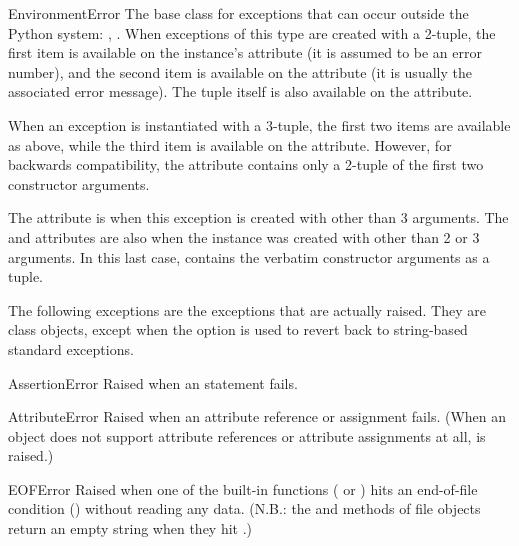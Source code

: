 \begin{excdesc}{EnvironmentError}
The base class for exceptions that
can occur outside the Python system: ,
.  When exceptions of this type are created with a
2-tuple, the first item is available on the instance's 
attribute (it is assumed to be an error number), and the second item
is available on the  attribute (it is usually the
associated error message).  The tuple itself is also available on the
 attribute.

When an  exception is instantiated with a
3-tuple, the first two items are available as above, while the third
item is available on the  attribute.  However, for
backwards compatibility, the  attribute contains only a
2-tuple of the first two constructor arguments.

The  attribute is  when this exception is
created with other than 3 arguments.  The  and
 attributes are also  when the instance was
created with other than 2 or 3 arguments.  In this last case,
 contains the verbatim constructor arguments as a tuple.
\end{excdesc}


The following exceptions are the exceptions that are actually raised.
They are class objects, except when the  option is used to
revert back to string-based standard exceptions.

\begin{excdesc}{AssertionError}
Raised when an  statement fails.
\end{excdesc}

\begin{excdesc}{AttributeError}
  Raised when an attribute reference or assignment fails.  (When an
  object does not support attribute references or attribute assignments
  at all,  is raised.)
\end{excdesc}

\begin{excdesc}{EOFError}
  Raised when one of the built-in functions ( or
  ) hits an end-of-file condition (\EOF{}) without
  reading any data.
  (N.B.: the  and  methods of file
  objects return an empty string when they hit \EOF{}.)
\end{excdesc}

